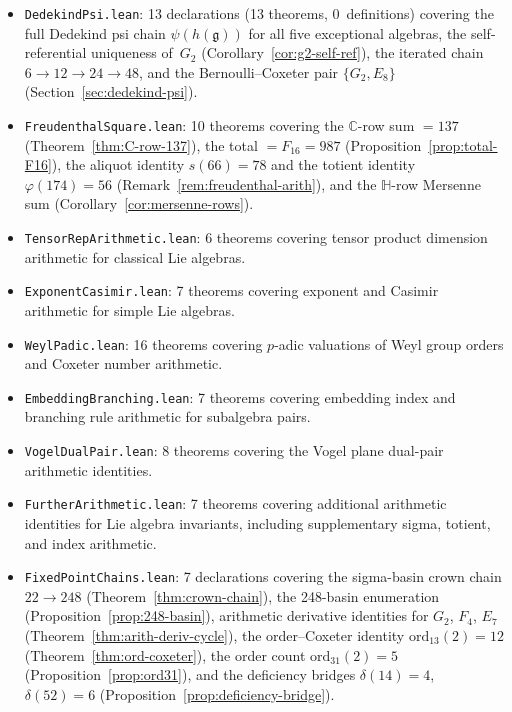\documentclass[11pt]{amsart}
\theoremstyle{plain}
\theoremstyle{definition}
\theoremstyle{remark}
\newcommand{\fg}{\mathfrak{g}}
\renewcommand{\Phi}{\varPhi}
\begin{document}
\begin{itemize}
    the self-referential $|\tau(2)| = 24$ identity, and the unified
    $2|\Phi|$ bridge (Section~\ref{sec:ramanujan}).
  \item \texttt{DedekindPsi.lean}: 13 declarations (13 theorems,
    0~definitions) covering the full Dedekind psi chain $\psi(h(\fg))$
    for all five exceptional algebras, the self-referential uniqueness
    of~$G_2$ (Corollary~\ref{cor:g2-self-ref}), the iterated chain
    $6 \to 12 \to 24 \to 48$, and the Bernoulli--Coxeter pair
    $\{G_2, E_8\}$ (Section~\ref{sec:dedekind-psi}).
  \item \texttt{FreudenthalSquare.lean}: 10 theorems covering the
    $\mathbb{C}$-row sum $= 137$
    (Theorem~\ref{thm:C-row-137}), the total $= F_{16} = 987$
    (Proposition~\ref{prop:total-F16}), the aliquot identity
    $s(66) = 78$ and the totient identity $\varphi(174) = 56$
    (Remark~\ref{rem:freudenthal-arith}), and the $\mathbb{H}$-row
    Mersenne sum (Corollary~\ref{cor:mersenne-rows}).
  \item \texttt{TensorRepArithmetic.lean}: 6 theorems covering tensor
    product dimension arithmetic for classical Lie algebras.
  \item \texttt{ExponentCasimir.lean}: 7 theorems covering exponent
    and Casimir arithmetic for simple Lie algebras.
  \item \texttt{WeylPadic.lean}: 16 theorems covering $p$-adic
    valuations of Weyl group orders and Coxeter number arithmetic.
  \item \texttt{EmbeddingBranching.lean}: 7 theorems covering
    embedding index and branching rule arithmetic for subalgebra pairs.
  \item \texttt{VogelDualPair.lean}: 8 theorems covering the Vogel
    plane dual-pair arithmetic identities.
  \item \texttt{FurtherArithmetic.lean}: 7 theorems covering additional
    arithmetic identities for Lie algebra invariants, including
    supplementary sigma, totient, and index arithmetic.
  \item \texttt{FixedPointChains.lean}: 7 declarations covering the
    sigma-basin crown chain $22 \to 248$
    (Theorem~\ref{thm:crown-chain}), the 248-basin enumeration
    (Proposition~\ref{prop:248-basin}), arithmetic derivative
    identities for $G_2$, $F_4$, $E_7$
    (Theorem~\ref{thm:arith-deriv-cycle}), the order--Coxeter
    identity $\mathrm{ord}_{13}(2)=12$
    (Theorem~\ref{thm:ord-coxeter}), the order count
    $\mathrm{ord}_{31}(2)=5$ (Proposition~\ref{prop:ord31}),
    and the deficiency bridges $\delta(14)=4$, $\delta(52)=6$
    (Proposition~\ref{prop:deficiency-bridge}).
\end{itemize}
\end{document}

